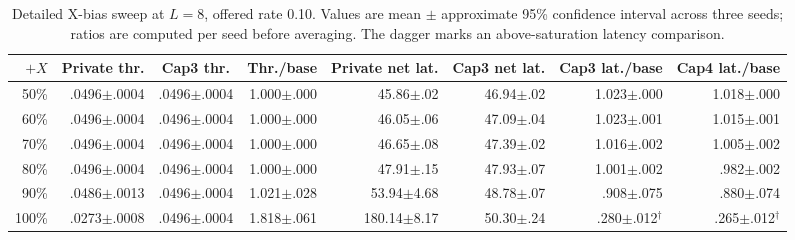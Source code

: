 \documentclass[10pt,twocolumn]{article}
\begin{document}
\begin{table}[t]
\centering
\caption{Detailed X-bias sweep at $L=8$, offered rate 0.10. Values are
mean $\pm$ approximate 95\% confidence interval across three seeds; ratios
are computed per seed before averaging. The dagger marks an above-saturation
latency comparison.}
\label{tab:xbias-detail}
\scriptsize
\begin{tabular}{rrrrrrrr}
\toprule
\(+X\) &
\multicolumn{1}{c}{Private thr.} &
\multicolumn{1}{c}{Cap3 thr.} &
\multicolumn{1}{c}{Thr./base} &
\multicolumn{1}{c}{Private net lat.} &
\multicolumn{1}{c}{Cap3 net lat.} &
\multicolumn{1}{c}{Cap3 lat./base} &
\multicolumn{1}{c}{Cap4 lat./base}\\
\midrule
50\%  & .0496$\pm$.0004 & .0496$\pm$.0004 & 1.000$\pm$.000 & 45.86$\pm$.02 & 46.94$\pm$.02 & 1.023$\pm$.000 & 1.018$\pm$.000\\
60\%  & .0496$\pm$.0004 & .0496$\pm$.0004 & 1.000$\pm$.000 & 46.05$\pm$.06 & 47.09$\pm$.04 & 1.023$\pm$.001 & 1.015$\pm$.001\\
70\%  & .0496$\pm$.0004 & .0496$\pm$.0004 & 1.000$\pm$.000 & 46.65$\pm$.08 & 47.39$\pm$.02 & 1.016$\pm$.002 & 1.005$\pm$.002\\
80\%  & .0496$\pm$.0004 & .0496$\pm$.0004 & 1.000$\pm$.000 & 47.91$\pm$.15 & 47.93$\pm$.07 & 1.001$\pm$.002 & .982$\pm$.002\\
90\%  & .0486$\pm$.0013 & .0496$\pm$.0004 & 1.021$\pm$.028 & 53.94$\pm$4.68 & 48.78$\pm$.07 & .908$\pm$.075 & .880$\pm$.074\\
100\% & .0273$\pm$.0008 & .0496$\pm$.0004 & 1.818$\pm$.061 & 180.14$\pm$8.17 & 50.30$\pm$.24 & .280$\pm$.012$^\dagger$ & .265$\pm$.012$^\dagger$\\
\bottomrule
\end{tabular}
\end{table}
\end{document}
